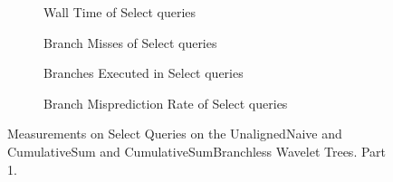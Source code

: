 \begin{figure}\tiny

\begin{subfigure}{0.48\textwidth}
	
	\caption{Wall Time of Select queries}
	\label{fig:CumulativeSumSelectWalltime}
\end{subfigure}
\hfill
\begin{subfigure}{0.48\textwidth}
	
	\caption{Branch Misses of Select queries}
	\label{fig:CumulativeSumSelectBranchMiss}
\end{subfigure}

\begin{subfigure}{0.48\textwidth}
	
	\caption{Branches Executed in Select queries}
	\label{fig:CumulativeSumSelectBranchExe}
\end{subfigure}
\hfill
\begin{subfigure}{0.48\textwidth}
	
	\caption{Branch Misprediction Rate of Select queries}
	\label{fig:CumulativeSumSelectBranchMissRate}
\end{subfigure}

\caption{Measurements on Select Queries on the UnalignedNaive and CumulativeSum and CumulativeSumBranchless Wavelet Trees. Part 1.}
\label{fig:CumulativeSumSelect}
\end{figure}



